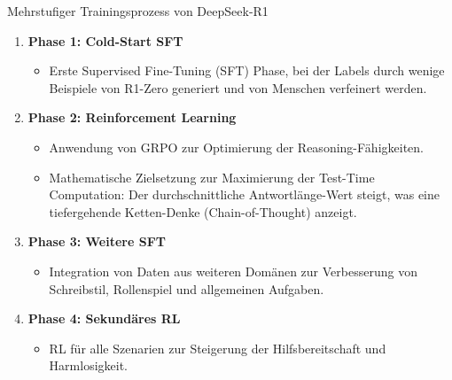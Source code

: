 \documentclass[aspectratio=1610, xcolor=dvipsnames, 9pt]{beamer}
\begin{document}
\begin{frame}{Mehrstufiger Trainingsprozess von DeepSeek-R1}
  \begin{enumerate}
      \item \textbf{Phase 1: Cold-Start SFT}
          \begin{itemize}
              \item Erste Supervised Fine-Tuning (SFT) Phase, bei der Labels durch wenige Beispiele von R1-Zero generiert und von Menschen verfeinert werden.
          \end{itemize}
      \item \textbf{Phase 2: Reinforcement Learning}
          \begin{itemize}
              \item Anwendung von GRPO zur Optimierung der Reasoning-Fähigkeiten.
              \item Mathematische Zielsetzung zur Maximierung der Test-Time Computation: Der durchschnittliche Antwortlänge-Wert steigt, was eine tiefergehende Ketten-Denke (Chain-of-Thought) anzeigt.
          \end{itemize}
      \item \textbf{Phase 3: Weitere SFT}
          \begin{itemize}
              \item Integration von Daten aus weiteren Domänen zur Verbesserung von Schreibstil, Rollenspiel und allgemeinen Aufgaben.
          \end{itemize}
      \item \textbf{Phase 4: Sekundäres RL}
          \begin{itemize}
              \item RL für alle Szenarien zur Steigerung der Hilfsbereitschaft und Harmlosigkeit.
          \end{itemize}
  \end{enumerate}
\end{frame}
\end{document}
